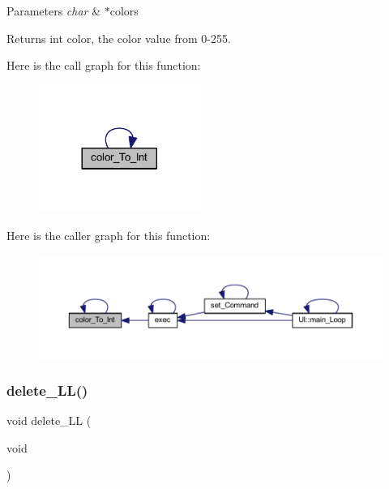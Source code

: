 \begin{DoxyParams}{Parameters}
{\em char} & $\ast$colors \\
\hline
\end{DoxyParams}
\begin{DoxyReturn}{Returns}
int color, the color value from 0-\/255. 
\end{DoxyReturn}
Here is the call graph for this function\+:\nopagebreak
\begin{figure}[H]
\begin{center}
\leavevmode
\includegraphics[width=149pt]{namespace_l_l_af61e12d8feebbbdb330c2405c305840b_cgraph}
\end{center}
\end{figure}
Here is the caller graph for this function\+:\nopagebreak
\begin{figure}[H]
\begin{center}
\leavevmode
\includegraphics[width=350pt]{namespace_l_l_af61e12d8feebbbdb330c2405c305840b_icgraph}
\end{center}
\end{figure}
\mbox{\label{namespace_l_l_a78899c6737310be03f8a2f05f9d7e09e}} 
\subsubsection{\texorpdfstring{delete\+\_\+\+L\+L()}{delete\_LL()}}
{\footnotesize\ttfamily void delete\+\_\+\+LL (\begin{DoxyParamCaption}\item[{void}]{ }\end{DoxyParamCaption})}



